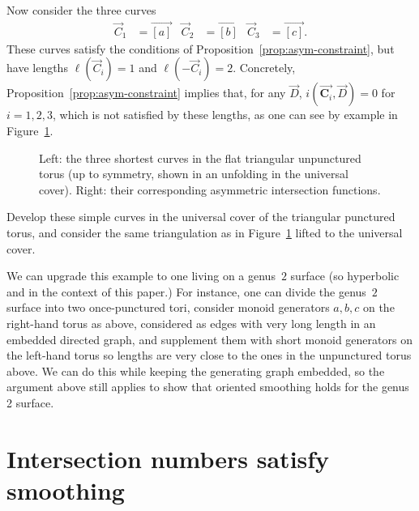 \documentclass[11pt]{amsart}
\newcommand*{\svgfignormal}[1]{\fontsize{9pt}{9pt}\selectfont}
\numberwithin{equation}{section}
\numberwithin{figure}{section}
\theoremstyle{definition}
\theoremstyle{plain}
\begin{document}
Now consider the three curves
\begin{align*}
  \vec C_1 &= \overrightarrow{[a]} & 
  \vec C_2 &= \overrightarrow{[b]} & 
  \vec C_3 &= \overrightarrow{[c]}.
\end{align*}
These curves satisfy the conditions of
Proposition~\ref{prop:asym-constraint}, but have lengths
$\ell(\vec C_i) = 1$ and $\ell(-\vec C_i) = 2$. Concretely,
Proposition~\ref{prop:asym-constraint} implies that, for any $\vec D$, $i(\vec{\mathbf C_i}, \vec D)=0$ for $i=1,2,3$, which is not satisfied by these lengths, as one
can see by example in Figure~\ref{fig:shortcurves}.


\begin{figure}
     \centering
     \begin{subfigure}[b]{0.5\textwidth}
\resizebox{70mm}{!} {\svgfignormal{torus_curves} }
     \end{subfigure}
     \hfill
     \begin{subfigure}[b]{0.4\textwidth}
\resizebox{40mm}{!}{\svgfignormal{intersection_asymmetric} }
\end{subfigure}
\caption{Left: the three shortest curves in the flat triangular unpunctured
  torus (up to symmetry, shown in an unfolding in the universal
  cover). Right: their corresponding asymmetric intersection functions.}
  \label{fig:shortcurves}
\end{figure}

 Develop these simple curves in the universal cover of the triangular punctured torus, and consider the same triangulation as in Figure~\ref{fig:shortcurves} lifted to the universal cover.
 
 We can upgrade this example to one living on a genus~$2$
surface (so hyperbolic and in the context of this paper.) For
instance, one can divide the genus~$2$ surface into two once-punctured tori, consider monoid generators $a,b,c$ on the right-hand torus as
above, considered as edges with very long length in an embedded
directed graph, and supplement them with short monoid generators on
the left-hand torus so lengths are very close to the ones in the unpunctured torus above. We can do this while keeping the generating graph
embedded, so the argument above still applies to show that oriented
smoothing holds for the genus 2 surface.


\section{Intersection numbers satisfy smoothing}
\label{app:necessary}
\end{document}

